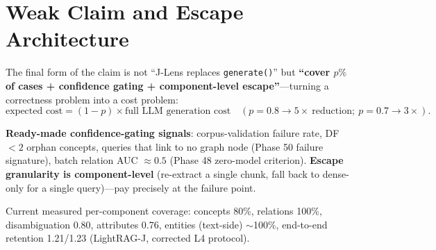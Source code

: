 \section{Weak Claim and Escape Architecture}
\label{sec:escape}

The final form of the claim is not ``J-Lens replaces \texttt{generate()}'' but
\textbf{``cover $p\%$ of cases + confidence gating + component-level
escape''}---turning a correctness problem into a cost problem:
\begin{equation}
\text{expected cost} = (1-p) \times \text{full LLM generation cost}
\quad (p = 0.8 \to 5\times\ \text{reduction};\ p = 0.7 \to 3\times).
\end{equation}

\textbf{Ready-made confidence-gating signals}: corpus-validation failure rate,
DF $< 2$ orphan concepts, queries that link to no graph node (Phase 50 failure
signature), batch relation AUC $\approx 0.5$ (Phase 48 zero-model criterion).
\textbf{Escape granularity is component-level} (re-extract a single chunk,
fall back to dense-only for a single query)---pay precisely at the failure
point.

Current measured per-component coverage: concepts 80\%, relations 100\%,
disambiguation 0.80, attributes 0.76, entities (text-side) $\sim$100\%,
end-to-end retention 1.21/1.23 (LightRAG-J, corrected L4 protocol).
